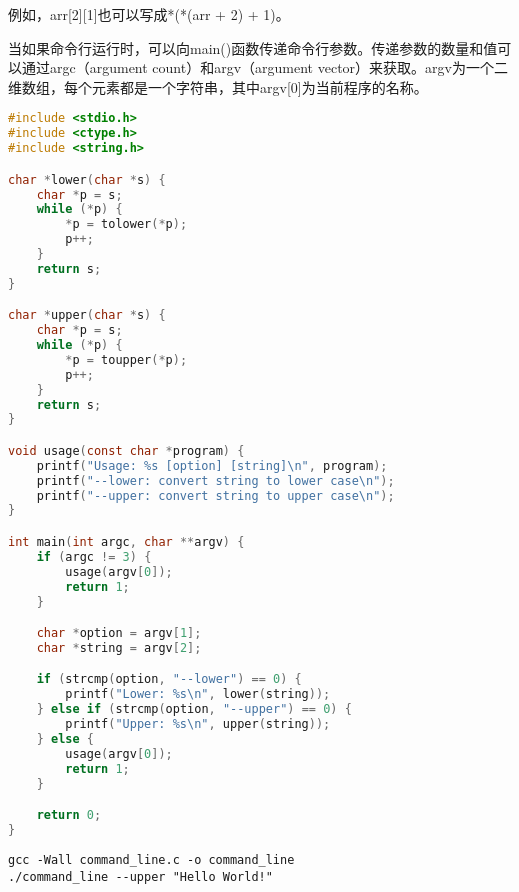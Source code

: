 例如，arr[2][1]也可以写成*(*(arr + 2) + 1)。

\begin{figure}[H]
    \centering
\end{figure}

当如果命令行运行时，可以向main()函数传递命令行参数。传递参数的数量和值可以通过argc（argument count）和argv（argument vector）来获取。argv为一个二维数组，每个元素都是一个字符串，其中argv[0]为当前程序的名称。\\


\begin{lstlisting}[language=C]
#include <stdio.h>
#include <ctype.h>
#include <string.h>

char *lower(char *s) {
    char *p = s;
    while (*p) {
        *p = tolower(*p);
        p++;
    }
    return s;
}

char *upper(char *s) {
    char *p = s;
    while (*p) {
        *p = toupper(*p);
        p++;
    }
    return s;
}

void usage(const char *program) {
    printf("Usage: %s [option] [string]\n", program);
    printf("--lower: convert string to lower case\n");
    printf("--upper: convert string to upper case\n");
}

int main(int argc, char **argv) {
    if (argc != 3) {
        usage(argv[0]);
        return 1;
    }

    char *option = argv[1];
    char *string = argv[2];

    if (strcmp(option, "--lower") == 0) {
        printf("Lower: %s\n", lower(string));
    } else if (strcmp(option, "--upper") == 0) {
        printf("Upper: %s\n", upper(string));
    } else {
        usage(argv[0]);
        return 1;
    }

    return 0;
}
\end{lstlisting}

\begin{lstlisting}
gcc -Wall command_line.c -o command_line
./command_line --upper "Hello World!"
\end{lstlisting}


